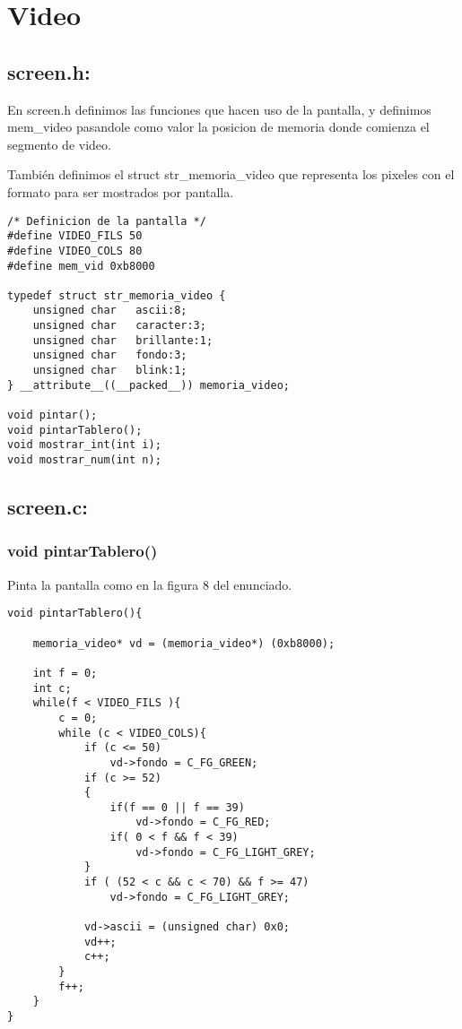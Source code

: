 
\section{Video}

\subsection{screen.h:}

En screen.h definimos las funciones que hacen uso de la pantalla, y definimos mem_video pasandole como valor la posicion de memoria 
donde comienza el segmento de video.

Tambi\'en definimos el struct str_memoria_video que representa los pixeles con el formato para ser mostrados por pantalla.
\begin{codesnippet}
\begin{verbatim}
/* Definicion de la pantalla */
#define VIDEO_FILS 50	
#define VIDEO_COLS 80	
#define mem_vid 0xb8000

typedef struct str_memoria_video {
    unsigned char   ascii:8;
    unsigned char   caracter:3;
    unsigned char   brillante:1;
    unsigned char   fondo:3;
    unsigned char   blink:1; 
} __attribute__((__packed__)) memoria_video;

void pintar();
void pintarTablero();
void mostrar_int(int i);
void mostrar_num(int n);
\end{verbatim}
\end{codesnippet}

\subsection{screen.c:}

\subsubsection{void pintarTablero()}
Pinta la pantalla como en la figura 8 del enunciado.
\begin{codesnippet}
\begin{verbatim}
void pintarTablero(){

    memoria_video* vd = (memoria_video*) (0xb8000);

    int f = 0;
    int c;
    while(f < VIDEO_FILS ){
        c = 0;
        while (c < VIDEO_COLS){
            if (c <= 50)
                vd->fondo = C_FG_GREEN;
            if (c >= 52)
            {
                if(f == 0 || f == 39)
                    vd->fondo = C_FG_RED;
                if( 0 < f && f < 39)
                    vd->fondo = C_FG_LIGHT_GREY;
            }
            if ( (52 < c && c < 70) && f >= 47)
                vd->fondo = C_FG_LIGHT_GREY;
			
            vd->ascii = (unsigned char) 0x0;
            vd++;	
            c++;
        }
        f++;
    }
}
\end{verbatim}
\end{codesnippet}


